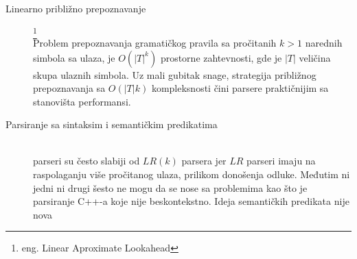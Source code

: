 \begin{description}

	\item[Linearno približno prepoznavanje]\footnote{eng. Linear Aproximate Lookahead} \hfill \\
	Problem prepoznavanja gramatičkog pravila sa pročitanih $k > 1$ narednih simbola sa ulaza, je $O(|T|^{k})$ prostorne zahtevnosti, gde je $|T|$ veličina skupa ulaznih simbola. Uz mali gubitak snage, strategija približnog prepoznavanja sa $O(|T|k)$ kompleksnosti čini \LLk parsere praktičnijim sa stanovišta performansi.
	\item[Parsiranje sa sintaksim i semantičkim predikatima] \hfill \\
	\LLk parseri su često slabiji od $LR(k)$ parsera jer $LR$ parseri imaju na raspolaganju više pročitanog ulaza, prilikom donošenja odluke. Međutim ni jedni ni drugi šesto ne mogu da se nose sa problemima kao što je parsiranje C++-a koje nije beskontekstno. Ideja semantičkih predikata nije nova\cite{attributed-transations}




\end{description}
